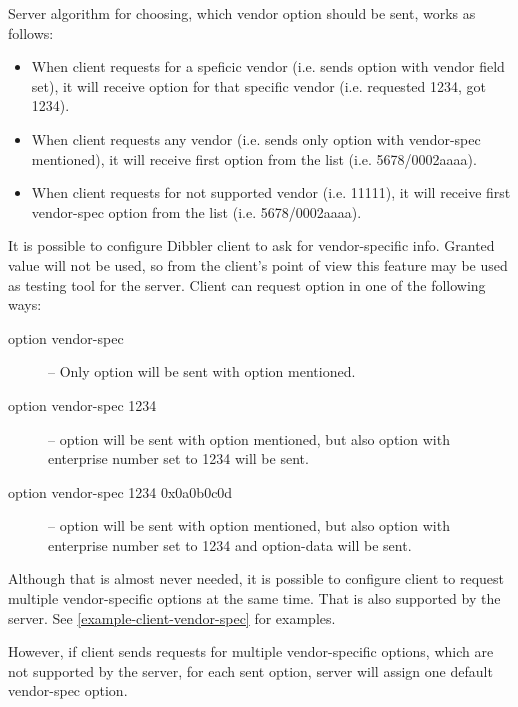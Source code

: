Server algorithm for choosing, which vendor option should be sent,
works as follows:

\begin{itemize}
\item When client requests for a speficic vendor (i.e. sends
   option with vendor field set), it will
  receive option for that specific vendor (i.e. requested 1234, got 1234).
 \item When client requests any vendor (i.e. sends only  option
   with vendor-spec mentioned), it will receive first  option from the list (i.e. 5678/0002aaaa).
 \item When client requests for not supported vendor (i.e. 11111), it will    
   receive first vendor-spec option from the list
   (i.e. 5678/0002aaaa).
\end{itemize}

It is possible to configure Dibbler client to ask for vendor-specific
info. Granted value will not be used, so from the client's point of
view this feature may be used as testing tool for the server. Client
can request  option in one of the following ways:

\begin{description}
\item[option vendor-spec] -- Only  option will be sent
  with  option mentioned.
\item[option vendor-spec 1234] --  option will be sent
  with  option mentioned, but also  option with enterprise number set to 1234 will be sent.
\item[option vendor-spec 1234 0x0a0b0c0d] --  option will be sent
  with  option mentioned, but also
 option with enterprise number set to 1234 and
option-data will be sent.
\end{description}

Although that is almost never needed, it is possible to configure
client to request multiple vendor-specific options at the same
time. That is also supported by the server. See
\ref{example-client-vendor-spec} for examples.


However, if client sends requests for multiple vendor-specific
options, which are not supported by the server, for each sent option,
server will assign one default vendor-spec option.

